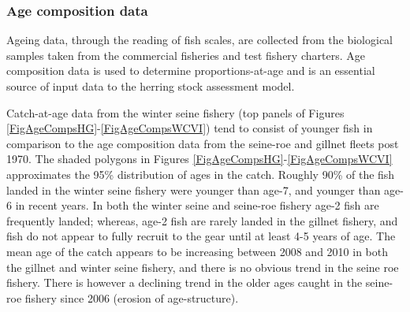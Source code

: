 	
	
	
	
	\subsubsection{Age composition data}
	
	Ageing data, through the reading of fish scales, are collected from the biological samples taken from the commercial fisheries and test fishery charters. Age composition data is used to determine proportions-at-age and is an essential source of input data to the herring stock assessment model.
	
	Catch-at-age data from the winter seine fishery (top panels of Figures \ref{FigAgeCompsHG}-\ref{FigAgeCompsWCVI}) tend to consist of younger fish in comparison to the age composition data from the seine-roe and gillnet fleets post 1970. The shaded polygons in Figures \ref{FigAgeCompsHG}-\ref{FigAgeCompsWCVI} approximates the 95\% distribution of ages in the catch.  Roughly 90\% of the fish landed in the winter seine fishery were younger than age-7, and younger than age-6 in recent years.  In both the winter seine and seine-roe fishery age-2 fish are frequently landed; whereas, age-2 fish are rarely landed in the gillnet fishery, and fish do not appear to fully recruit to the gear until at least 4-5 years of age.  The mean age of the catch appears to be increasing between 2008 and 2010 in both the gillnet and winter seine fishery, and there is no obvious trend in the seine roe fishery.  There is however a declining trend in the older ages caught in the seine-roe fishery since 2006 (erosion of age-structure).


